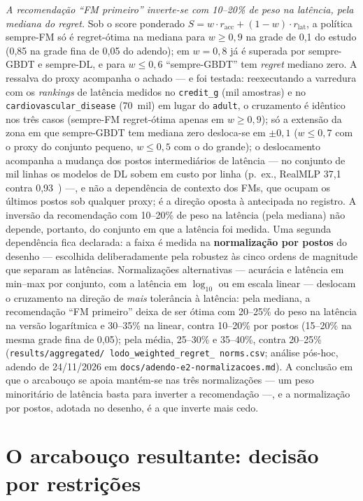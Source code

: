 \emph{A recomendação ``FM primeiro'' inverte-se com 10--20\% de
peso na latência, pela mediana do \emph{regret}.} Sob o score ponderado
$S = w \cdot r_{\text{acc}} + (1-w) \cdot r_{\text{lat}}$, a política
sempre-FM só é regret-ótima na mediana para $w \geq 0{,}9$ na grade
de 0,1 do estudo (0,85 na grade fina de 0,05 do adendo); em
$w{=}0{,}8$ já é superada por sempre-GBDT e sempre-DL, e para
$w \leq 0{,}6$ ``sempre-GBDT'' tem \emph{regret} mediano zero. A ressalva
do proxy acompanha o achado --- e foi testada: reexecutando a varredura
com os \emph{rankings} de latência medidos no \texttt{credit\_g} (mil
amostras) e no \texttt{cardiovascular\_\allowbreak disease} (70~mil) em lugar do
\texttt{adult}, o cruzamento é idêntico nos três casos (sempre-FM
regret-ótima apenas em $w \geq 0{,}9$); só a extensão da zona em que
sempre-GBDT tem mediana zero desloca-se em $\pm 0{,}1$ ($w \leq 0{,}7$
com o proxy do conjunto pequeno, $w \leq 0{,}5$ com o do grande); o
deslocamento acompanha a mudança dos postos intermediários de
latência --- no conjunto de mil linhas os modelos de DL sobem em
custo por linha (p.~ex., RealMLP 37,1 contra 0,93~\us) ---, e não a
dependência de contexto dos FMs, que ocupam os últimos postos sob
qualquer proxy; é a direção oposta à antecipada no registro. A inversão da
recomendação com 10--20\% de peso na latência (pela mediana) não
depende, portanto, do
conjunto em que a latência foi medida. Uma segunda dependência fica
declarada: a faixa é medida na \textbf{normalização por postos} do
desenho --- escolhida deliberadamente pela robustez às cinco ordens de
magnitude que separam as latências. Normalizações alternativas ---
acurácia e latência em min--max por conjunto, com a latência em
$\log_{10}$ ou em escala linear --- deslocam o cruzamento na direção
de \emph{mais} tolerância à latência: pela mediana, a recomendação
``FM primeiro'' deixa de ser ótima com 20--25\% do peso na latência
na versão logarítmica e 30--35\% na linear, contra 10--20\% por
postos (15--20\% na mesma grade fina de 0,05); pela média, 25--30\%
e 35--40\%, contra 20--25\%
(\texttt{results/\allowbreak aggregated/\allowbreak
lodo\_\allowbreak weighted\_\allowbreak regret\_\allowbreak
norms.csv}; análise pós-hoc, adendo de 24/11/2026 em
\texttt{docs/\allowbreak adendo-e2-normalizacoes.md}). A conclusão
em que o arcabouço se apoia mantém-se nas três normalizações --- um peso minoritário de
latência basta para inverter a recomendação ---, e a normalização
por postos, adotada no desenho, é a que inverte mais cedo.

\section{O arcabouço resultante: decisão por restrições}
\label{sec:arcabouco-resultante}


